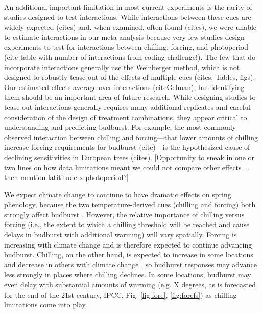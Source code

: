 \documentclass[11pt,letter]{article}
\begin{document}
\par An additional important limitation in most current experiments is the rarity of studies designed to test interactions. While interactions between these cues are widely expected (cites) and, when examined, often found (cites), we were unable to estimate interactions in our meta-analysis because very few studies design experiments to test for interactions between chilling, forcing, and photoperiod (cite table with number of interactions from coding challenge!). The few that do incorporate interactions generally use the Weinberger method, which is not designed to robustly tease out of the effects of multiple cues (cites, Tables, figs).  Our estimated effects average over interactions (citeGelman), but identifying them should be an important area of future research. While designing studies to tease out interactions generally requires many additional replicates and careful consideration of the design of treatment combinations, they appear critical to understanding and predicting budburst. For example, the most commonly observed interaction between chilling and forcing---that lower amounts of chilling increase forcing requirements for budburst (cite)---is the hypothesized cause of declining sensitivities in European trees (cites). [Opportunity to sneak in one or two lines on how data limitations meant we could not compare other effects ... then mention latititude x photoperiod?] %

\par We expect climate change to continue to have dramatic effects on spring phenology, because the two temperature-derived cues (chilling and forcing)  both strongly affect budburst  \citep{Laube2014a}. However, the relative importance of chilling versus forcing (i.e., the extent to which a chilling threshold will be reached and cause delays in budburst with additional warming) will vary spatially. Forcing is increasing with climate change and is therefore expected to continue advancing budburst. Chilling, on the other hand, is expected to increase in some locations and decrease in others with climate change  \citep{fraga2019}, so budburst responses may advance less strongly in places where chilling declines. In some locations, budburst may even delay with substantial amounts of warming (e.g. X degrees, as is forecasted for the end of the 21st century, IPCC, Fig. \ref {fig:fore}, \ref {fig:forefs}) as chilling limitations come into play. 
\end{document}
